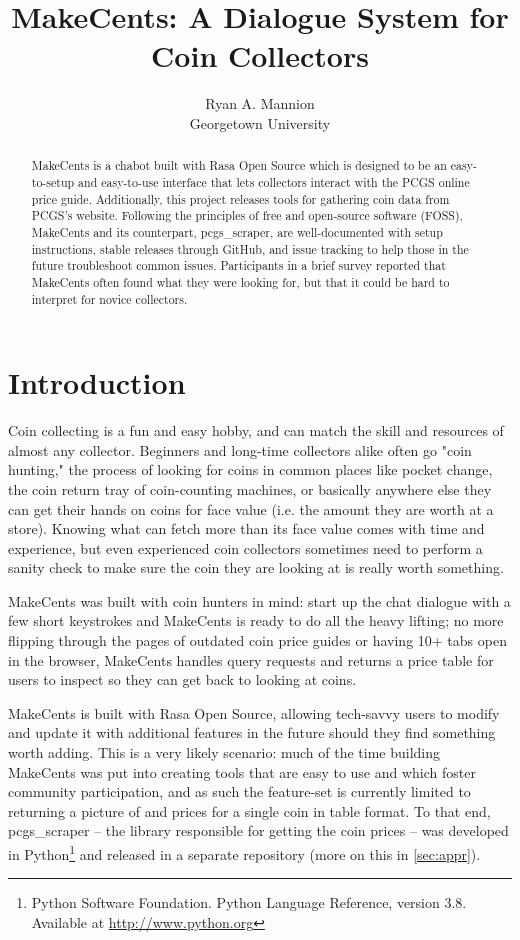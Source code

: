 \documentclass[11pt,a4paper]{article}
\title{MakeCents: A Dialogue System for Coin Collectors}
\author{Ryan A. Mannion \\ Georgetown University \\ \eml{ram321@georgetown.edu}
}
\date{}
\begin{document}
\maketitle
\begin{abstract}
MakeCents is a chabot built with Rasa Open Source which is designed to be an easy-to-setup and easy-to-use interface that lets collectors interact with the PCGS online price guide. Additionally, this project releases tools for gathering coin data from PCGS's website. Following the principles of free and open-source software (FOSS), MakeCents and its counterpart, pcgs\_scraper, are well-documented with setup instructions, stable releases through GitHub, and issue tracking to help those in the future troubleshoot common issues. Participants in a brief survey reported that MakeCents often found what they were looking for, but that it could be hard to interpret for novice collectors.
\end{abstract}

\section{Introduction}
Coin collecting is a fun and easy hobby, and can match the skill and resources of almost any collector. Beginners and long-time collectors alike often go "coin hunting," the process of looking for coins in common places like pocket change, the coin return tray of coin-counting machines, or basically anywhere else they can get their hands on coins for face value (i.e. the amount they are worth at a store). Knowing what can fetch more than its face value comes with time and experience, but even experienced coin collectors sometimes need to perform a sanity check to make sure the coin they are looking at is really worth something. 

MakeCents was built with coin hunters in mind: start up the chat dialogue with a few short keystrokes and MakeCents is ready to do all the heavy lifting; no more flipping through the pages of outdated coin price guides or having 10+ tabs open in the browser, MakeCents handles query requests and returns a price table for users to inspect so they can get back to looking at coins. 

MakeCents is built with  Rasa Open Source, allowing tech-savvy users to modify and update it with additional features in the future should they find something worth adding. This is a very likely scenario: much of the time building MakeCents was put into creating tools that are easy to use and which foster community participation, and as such the feature-set is currently limited to returning a picture of and prices for a single coin in table format. To that end, pcgs\_scraper -- the library responsible for getting the coin prices -- was developed in Python\footnote{Python Software Foundation. Python Language Reference, version 3.8. Available at \href{http://www.python.org}{http://www.python.org}} and released in a separate repository (more on this in \cref{sec:appr}).
\end{document}
